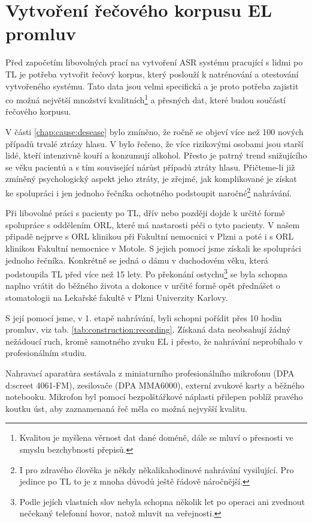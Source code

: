 \section{Vytvoření řečového korpusu EL promluv}
\label{chap:construction:corpus}

Před započetím libovolných prací na vytvoření ASR systému pracující s lidmi po TL je potřeba vytvořit řečový korpus, který poslouží k natrénování a otestování vytvořeného systému. Tato data jsou velmi specifická a je proto potřeba zajistit co možná největší množství kvalitních\footnote{Kvalitou je myšlena věrnost dat dané doméně, dále se mluví o přesnosti ve smyslu bezchybnosti přepisů.} a přesných dat, které budou součástí řečového korpusu.

V části \ref{chap:cause:desease} bylo zmíněno, že ročně se objeví více než 100 nových případů trvalé ztrázy hlasu. V \cite{Skvrnakova2010} bylo řečeno, že více rizikovými osobami jsou starší lidé, kteří intenzivně kouří a konzumují alkohol. Přesto je patrný trend snižujícího se věku pacientů a s tím související nárůst případů ztráty hlasu. Přičteme-li již zmíněný psychologický aspekt jeho ztráty, je zřejmé, jak komplikované je získat ke spolupráci i jen jednoho řečníka ochotného podstoupit naročné\footnote{I pro zdravého člověka je někdy někalikahodinové nahrávání vysilující. Pro jedince po TL to je z mnoha důvodů ještě řádově náročnější.} nahrávání.

Při libovolné práci s pacienty po TL, dřív nebo později dojde k určité formě spolupráce s oddělením ORL, které má nastarosti péči o tyto pacienty. V našem připadě nejprve s ORL klinikou při Fakultní nemocnici v Plzni a poté i s ORL klinikou Fakultní nemocnice v Motole. S jejich pomocí jsme získali ke spolupráci jednoho řečníka. Konkrétně se jedná o dámu v duchodovém věku, která podstoupila TL před více než 15 lety. Po překonání ostychu\footnote{Podle jejích vlastních slov nebyla schopna několik let po operaci ani zvednout nečekaný telefonní hovor, natož mluvit na veřejnosti.} se byla schopna naplno vrátit do běžného života a dokonce v určité formě opět přednášet o stomatologii na Lekařské fakultě v Plzni Univerzity Karlovy.

S její pomocí jsme, v 1. etapě nahrávání, byli schopni pořídit přes 10 hodin promluv, viz tab. \ref{tab:construction:recording}. Získaná data neobsahují žádný nežádoucí ruch, kromě samotného zvuku EL i přesto, že nahrávání neprobíhalo v profesionálním studiu.

Nahravací aparatůra sestávala z miniaturního profesionálního mikrofonu (DPA d:screet 4061-FM), zesilovače (DPA MMA6000), externí zvukové karty a běžného notebooku. Mikrofon byl pomocí bezpolštářkové náplasti přilepen poblíž pravého koutku úst, aby zaznamenaná řeč měla co možná nejvyšší kvalitu.

